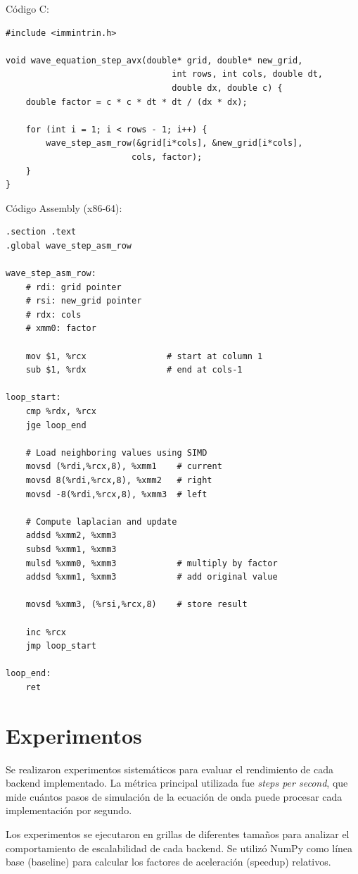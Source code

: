 \documentclass[a4paper]{article}
\begin{document}
Código C:
\begin{verbatim}
#include <immintrin.h>

void wave_equation_step_avx(double* grid, double* new_grid,
                                 int rows, int cols, double dt,
                                 double dx, double c) {
    double factor = c * c * dt * dt / (dx * dx);
    
    for (int i = 1; i < rows - 1; i++) {
        wave_step_asm_row(&grid[i*cols], &new_grid[i*cols], 
                         cols, factor);
    }
}
\end{verbatim}

Código Assembly (x86-64):
\begin{verbatim}
.section .text
.global wave_step_asm_row

wave_step_asm_row:
    # rdi: grid pointer
    # rsi: new_grid pointer  
    # rdx: cols
    # xmm0: factor
    
    mov $1, %rcx                # start at column 1
    sub $1, %rdx                # end at cols-1
    
loop_start:
    cmp %rdx, %rcx
    jge loop_end
    
    # Load neighboring values using SIMD
    movsd (%rdi,%rcx,8), %xmm1    # current
    movsd 8(%rdi,%rcx,8), %xmm2   # right
    movsd -8(%rdi,%rcx,8), %xmm3  # left
    
    # Compute laplacian and update
    addsd %xmm2, %xmm3            
    subsd %xmm1, %xmm3
    mulsd %xmm0, %xmm3            # multiply by factor
    addsd %xmm1, %xmm3            # add original value
    
    movsd %xmm3, (%rsi,%rcx,8)    # store result
    
    inc %rcx
    jmp loop_start
    
loop_end:
    ret
\end{verbatim}

\section{Experimentos}

Se realizaron experimentos sistemáticos para evaluar el rendimiento de cada backend implementado. La métrica principal utilizada fue \textit{steps per second}, que mide cuántos pasos de simulación de la ecuación de onda puede procesar cada implementación por segundo.

Los experimentos se ejecutaron en grillas de diferentes tamaños para analizar el comportamiento de escalabilidad de cada backend. Se utilizó NumPy como línea base (baseline) para calcular los factores de aceleración (speedup) relativos.
\end{document}
